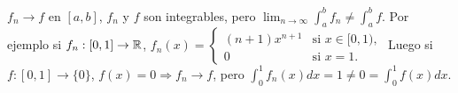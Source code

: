 \begin{note}
  \(f_n \to f\) en \([a, b]\), \(f_n\) y \(f\) son integrables, pero \(\lim_{n \to \infty} \int_a^b f_n \neq \int_a^b f\). Por ejemplo si \(f_n: [0, 1] \to \mathbb{R} \), \(f_n(x) = \begin{cases}
      (n+1) x^{n+1} & \text{si } x \in [0, 1), \\
      0             & \text{si } x = 1.
    \end{cases} \) Luego si \(f: [0, 1] \to \{0\} \), \(f(x) = 0 \Rightarrow f_n \to f\), pero \(\int_0^1 f_n(x) dx = 1 \neq 0 = \int_0^1 f(x) dx\).
\end{note}
